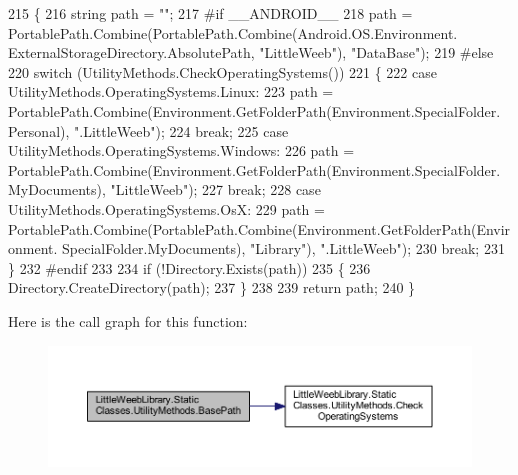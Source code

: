\begin{DoxyCode}
215         \{
216             \textcolor{keywordtype}{string} path = \textcolor{stringliteral}{""};
217 \textcolor{preprocessor}{#if \_\_ANDROID\_\_}
218              path = PortablePath.Combine(PortablePath.Combine(Android.OS.Environment.
      ExternalStorageDirectory.AbsolutePath, \textcolor{stringliteral}{"LittleWeeb"}), \textcolor{stringliteral}{"DataBase"});
219 \textcolor{preprocessor}{#else}
220             \textcolor{keywordflow}{switch} (UtilityMethods.CheckOperatingSystems())
221             \{
222                 \textcolor{keywordflow}{case} UtilityMethods.OperatingSystems.Linux:
223                     path = PortablePath.Combine(Environment.GetFolderPath(Environment.SpecialFolder.
      Personal), \textcolor{stringliteral}{".LittleWeeb"});
224                     \textcolor{keywordflow}{break};
225                 \textcolor{keywordflow}{case} UtilityMethods.OperatingSystems.Windows:
226                     path = PortablePath.Combine(Environment.GetFolderPath(Environment.SpecialFolder.
      MyDocuments), \textcolor{stringliteral}{"LittleWeeb"});
227                     \textcolor{keywordflow}{break};
228                 \textcolor{keywordflow}{case} UtilityMethods.OperatingSystems.OsX:
229                     path = PortablePath.Combine(PortablePath.Combine(Environment.GetFolderPath(Environment.
      SpecialFolder.MyDocuments), \textcolor{stringliteral}{"Library"}), \textcolor{stringliteral}{".LittleWeeb"});
230                     \textcolor{keywordflow}{break};
231             \}
232 \textcolor{preprocessor}{#endif}
233 
234             \textcolor{keywordflow}{if} (!Directory.Exists(path))
235             \{
236                 Directory.CreateDirectory(path);
237             \}
238 
239             \textcolor{keywordflow}{return} path;
240         \}
\end{DoxyCode}
Here is the call graph for this function\+:\nopagebreak
\begin{figure}[H]
\begin{center}
\leavevmode
\includegraphics[width=350pt]{class_little_weeb_library_1_1_static_classes_1_1_utility_methods_a9fe4cf5d219f0453436fe9c85ad261bf_cgraph}
\end{center}
\end{figure}
